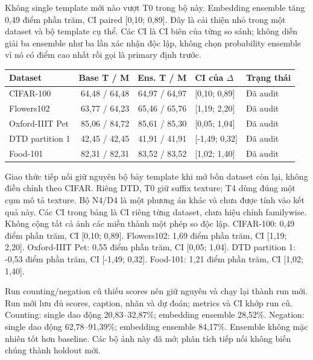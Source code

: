 \documentclass[11pt,a4paper]{article}
\begin{document}
Không single template mới nào vượt T0 trong bộ này. Embedding ensemble tăng 0,49 điểm phần trăm, CI paired [0,10; 0,89]. Đây là cải thiện nhỏ trong một dataset và bộ template cụ thể. Các CI là CI biên của từng so sánh; không diễn giải ba ensemble như ba lần xác nhận độc lập, không chọn probability ensemble vì nó có điểm cao nhất rồi gọi là primary định trước.

\begin{center}\small
{}
\begin{tabular}{@{}lrrll@{}}\toprule
Dataset & Base T / M & Ens. T / M & CI của $\Delta$ & Trạng thái\\\midrule
CIFAR-100 & 64,48 / 64,48 & 64,97 / 64,97 & [0,10; 0,89] & Đã audit\\
Flowers102 & 63,77 / 64,23 & 65,46 / 65,76 & [1,19; 2,20] & Đã audit\\
Oxford-IIIT Pet & 85,06 / 84,72 & 85,61 / 85,30 & [0,05; 1,04] & Đã audit\\
DTD partition 1 & 42,45 / 42,45 & 41,91 / 41,91 & [-1,49; 0,32] & Đã audit\\
Food-101 & 82,31 / 82,31 & 83,52 / 83,52 & [1,02; 1,40] & Đã audit\\
\bottomrule\end{tabular}\end{center}

Giao thức tiếp nối giữ nguyên bộ bảy template khi mở bốn dataset còn lại, không điều chỉnh theo CIFAR. Riêng DTD, T0 giữ suffix texture; T4 dùng đúng một cụm mô tả texture. Bộ N4/D4 là một phương án khác và chưa được tính vào kết quả này. Các CI trong bảng là CI riêng từng dataset, chưa hiệu chỉnh familywise. Không cộng tất cả ảnh các miền thành một phép so độc lập. CIFAR-100: 0,49 điểm phần trăm, CI [0,10; 0,89]. Flowers102: 1,69 điểm phần trăm, CI [1,19; 2,20]. Oxford-IIIT Pet: 0,55 điểm phần trăm, CI [0,05; 1,04]. DTD partition 1: -0,53 điểm phần trăm, CI [-1,49; 0,32]. Food-101: 1,21 điểm phần trăm, CI [1,02; 1,40].

Run counting/negation cũ thiếu scores nên giữ nguyên và chạy lại thành run mới. Run mới lưu đủ scores, caption, nhãn và dự đoán; metrics và CI khớp run cũ. Counting: single dao động 20,83--32,87\%; embedding ensemble 28,52\%. Negation: single dao động 62,78--91,39\%; embedding ensemble 84,17\%. Ensemble không mặc nhiên tốt hơn baseline. Các bộ ảnh này đã mở; phân tích tiếp nối không biến chúng thành holdout mới.
\end{document}
